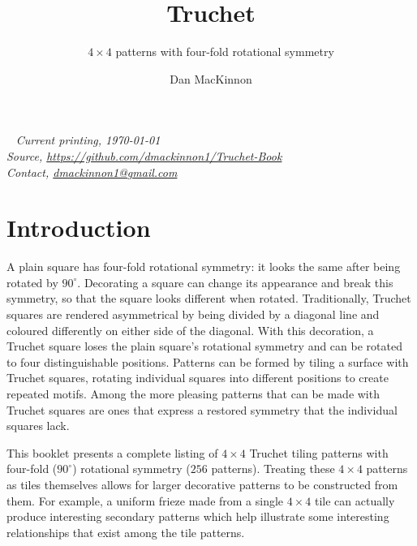 \documentclass{tufte-book}
\title{Truchet}
\subtitle{\texorpdfstring{$4\times4$}{4x4} patterns with four-fold rotational symmetry}
\author[]{Dan MacKinnon}
\begin{document}



\maketitle


\newpage
\begin{fullwidth}
~\vfill
\thispagestyle{empty}
\setlength{\parindent}{0pt}
\textit{Current printing, \today}\\
\textit{Source, \url{https://github.com/dmackinnon1/Truchet-Book}}\\
\textit{Contact, \href{mailto://dmackinnon1@gmail.com}{dmackinnon1@gmail.com}}
\end{fullwidth}

\cleardoublepage

\chapter*{Introduction}

\noindent
\marginnote{\centering}A plain square has four-fold rotational symmetry: it looks the same after being rotated by $90^{\circ}$. Decorating a square can change its appearance and break this symmetry, so that the square looks different when rotated. Traditionally, Truchet squares are rendered asymmetrical by being divided by a diagonal line and coloured differently on either side of the diagonal. With this decoration, a Truchet square loses the plain square's rotational symmetry and can be rotated to four distinguishable positions. \marginnote[3\baselineskip]{\centering}Patterns can be formed by tiling a surface with Truchet squares, rotating individual squares into different positions to create repeated motifs. Among the more pleasing patterns that can be made with Truchet squares are ones that express a restored symmetry that the individual squares lack.

\vspace{0.3cm}
\noindent
This booklet presents a complete listing of $4\times 4$ Truchet tiling patterns with four-fold ($90^{\circ}$) rotational symmetry ($256$ patterns).  Treating these $4\times 4$ patterns as tiles themselves allows for larger decorative patterns to be constructed from them. For example, a uniform frieze made from a single $4\times 4$ tile can actually produce interesting secondary patterns which help illustrate some interesting relationships that exist among the tile patterns.  
\end{document}
